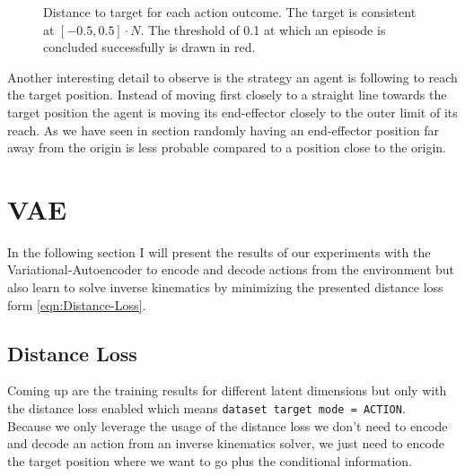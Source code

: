 \begin{figure}
\begin{center}
{            \label{fig:SAC_baseline_inference/distance_15}
            }
    \end{center}
    \caption[SAC baseline inference]{Distance to target for each action outcome. The target is consistent at $[-0.5, 0.5] \cdot N$. The threshold of 0.1 at which an episode is concluded successfully is drawn in red.} 
    \label{fig:SAC_baseline_inference_distance}
\end{figure}
Another interesting detail to observe is the strategy an agent is following to reach the target position. Instead of moving first closely to a straight line towards the target position the agent is moving its end-effector closely to the outer limit of its reach. As we have seen in section  randomly having an end-effector position far away from the origin is less probable compared to a position close to the origin. 

\section{VAE}

In the following section I will present the results of our experiments with the Variational-Autoencoder to encode and decode actions from the environment but also learn to solve inverse kinematics by minimizing the presented distance loss form \eqref{eqn:Distance-Loss}. 

\subsection{Distance Loss}

Coming up are the training results for different latent dimensions but only with the distance loss enabled which means \texttt{dataset target mode = ACTION}.\\ 
Because we only leverage the usage of the distance loss we don't need to encode and decode an action from an inverse kinematics solver, we just need to encode the target position where we want to go plus the conditional information.

